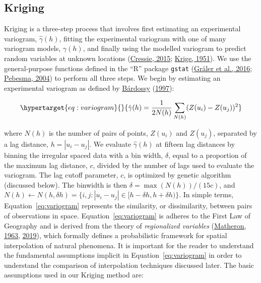 \documentclass[draft,linenumbers]{agujournal2018}
\begin{document}
\subsection{Kriging}

Kriging is a three-step process that involves first estimating an
experimental variogram, \(\hat{\gamma}(h)\), fitting the experimental
variogram with one of many variogram models, \(\gamma(h)\), and finally
using the modelled variogram to predict random variables at unknown
locations (\protect\hyperlink{ref-cressie2015}{Cressie, 2015};
\protect\hyperlink{ref-krige1951}{Krige, 1951}). We use the
general-purpose functions defined in the ``R'' package \texttt{gstat}
(\protect\hyperlink{ref-graler2016}{Gräler et al., 2016};
\protect\hyperlink{ref-pebesma2004}{Pebesma, 2004}) to perform all three
steps. We begin by estimating an experimental variogram as defined by
\protect\hyperlink{ref-bardossy1997}{Bárdossy}
(\protect\hyperlink{ref-bardossy1997}{1997}):

\begin{equation}\protect\hypertarget{eq:variogram}{}{\hat{\gamma}(h) = \frac{1}{2N(h)}\sum_{N(h)}^{}(Z(u_i) - Z(u_j))^2}\label{eq:variogram}\end{equation}

where \(N(h)\) is the number of pairs of points, \(Z(u_i)\) and
\(Z(u_j)\), separated by a lag distance, \(h = |u_i - u_j|\). We
evaluate \(\hat{\gamma}(h)\) at fifteen lag distances by binning the
irregular spaced data with a bin width, \(\delta\), equal to a
proportion of the maximum lag distance, \(c\), divided by the number of
lags used to evaluate the variogram. The lag cutoff parameter, \(c\), is
optimized by genetic algorithm (discussed below). The binwidth is then
\(\delta = \max (N(h))/(15c)\), and
\(N(h) \leftarrow N(h, \delta h) = \{i,j:|u_i - u_j| \in [h - \delta h, h + \delta h)\}\).
In simple terms, Equation~\ref{eq:variogram} represents the similarity,
or dissimilarity, between pairs of observations in space.
Equation~\ref{eq:variogram} is adheres to the First Law of Geography and
is derived from the theory of \emph{regionalized variables}
(\protect\hyperlink{ref-matheron1963}{Matheron, 1963},
\protect\hyperlink{ref-matheron2019}{2019}), which formally defines a
probabilistic framework for spatial interpolation of natural phenomena.
It is important for the reader to understand the fundamental assumptions
implicit in Equation~\ref{eq:variogram} in order to understand the
comparison of interpolation techniques discussed later. The basic
assumptions used in our Kriging method are:
\end{document}
